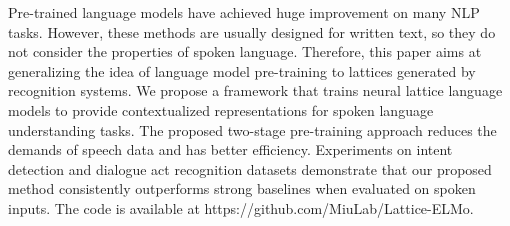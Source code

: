 Pre-trained language models have achieved huge improvement on many NLP tasks. However, these methods are usually designed for written text, so they do not consider the properties of spoken language. Therefore, this paper aims at generalizing the idea of language model pre-training to lattices generated by recognition systems. We propose a framework that trains neural lattice language models to provide contextualized representations for spoken language understanding tasks. The proposed two-stage pre-training approach reduces the demands of speech data and has better efficiency. Experiments on intent detection and dialogue act recognition datasets demonstrate that our proposed method consistently outperforms strong baselines when evaluated on spoken inputs. The code is available at https://github.com/MiuLab/Lattice-ELMo.
